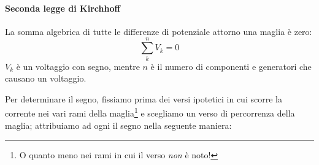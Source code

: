 \paragraph{Seconda legge di Kirchhoff}
\begin{theoremaqed}
	La somma algebrica di tutte le differenze di potenziale attorno una maglia è zero:
	\begin{equation}
		\sum_k^nV_k=0
	\end{equation}
	$V_k$ è un voltaggio con segno, mentre $n$ è il numero di componenti e generatori che causano un voltaggio.
\end{theoremaqed}
 Per determinare il segno, fissiamo prima dei versi ipotetici in cui scorre la corrente nei vari rami della maglia\footnote{O quanto meno nei rami in cui il verso \textit{non} è noto!} e scegliamo un verso di percorrenza della maglia; attribuiamo ad ogni \ddp il segno nella seguente maniera:
